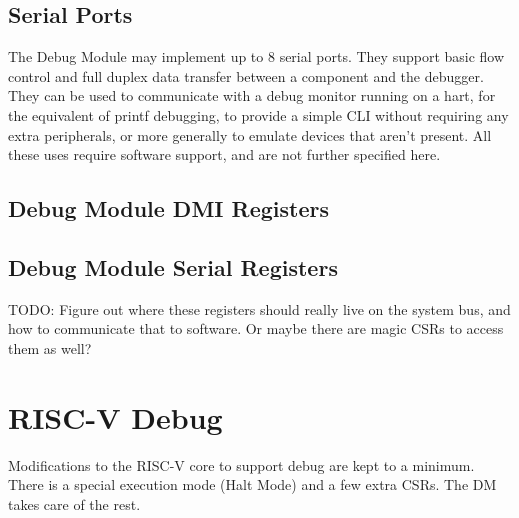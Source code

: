 \documentclass{article}
\begin{document}
\subsection{Serial Ports}

The Debug Module may implement up to 8 serial ports. They support basic flow
control and full duplex data transfer between a component and the debugger.
They can be used to communicate with a debug monitor running on a hart, for the
equivalent of printf debugging, to provide a simple CLI without requiring any
extra peripherals, or more generally to emulate devices that aren't present.
All these uses require software support, and are not further specified here.

\subsection{Debug Module DMI Registers} \label{dmdebbus}



\subsection{Debug Module Serial Registers} \label{dmsysbus}

TODO: Figure out where these registers should really live on the system bus,
and how to communicate that to software. Or maybe there are magic CSRs to
access them as well?



%
%

\section{RISC-V Debug}

Modifications to the RISC-V core to support debug are kept to a minimum.  There
is a special execution mode (Halt Mode) and a few extra CSRs. The DM takes care
of the rest.
\end{document}
